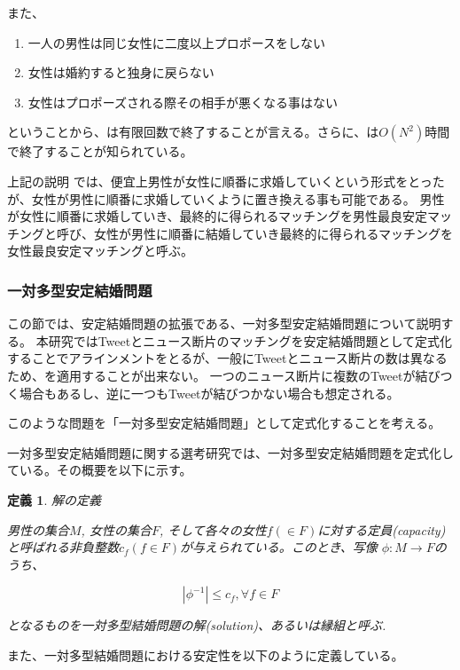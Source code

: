 \documentclass[12pt]{jarticle}
\newtheorem{definittion}{定義}[section]
\begin{document}
また、
\begin{enumerate}
\item 一人の男性は同じ女性に二度以上プロポースをしない
\item 女性は婚約すると独身に戻らない
\item 女性はプロポーズされる際その相手が悪くなる事はない
\end{enumerate}

ということから、\gsa は有限回数で終了することが言える。さらに、\gsa は$O(N^2)$時間で終了することが知られている。

上記の説明 では、便宜上男性が女性に順番に求婚していくという形式をとったが、女性が男性に順番に求婚していくように置き換える事も可能である。
男性が女性に順番に求婚していき、最終的に得られるマッチングを男性最良安定マッチングと呼び、女性が男性に順番に結婚していき最終的に得られるマッチングを女性最良安定マッチングと呼ぶ。

\subsubsection{一対多型安定結婚問題}
この節では、安定結婚問題の拡張である、一対多型安定結婚問題について説明する。
本研究ではTweetとニュース断片のマッチングを安定結婚問題として定式化することでアラインメントをとるが、一般にTweetとニュース断片の数は異なるため、\gsa を適用することが出来ない。
一つのニュース断片に複数のTweetが結びつく場合もあるし、逆に一つもTweetが結びつかない場合も想定される。

このような問題を「一対多型安定結婚問題」として定式化することを考える。

一対多型安定結婚問題に関する選考研究\cite{psmp}では、一対多型安定結婚問題を定式化している。その概要を以下に示す。

\begin{definittion}
\label{psmp_def_1}
解の定義

男性の集合$M$, 女性の集合$F$, そして各々の女性$f(\in F)$に対する定員(capacity)と呼ばれる非負整数$c_f(f \in F)$が与えられている。このとき、写像 $\phi : M \rightarrow F$のうち、

\begin{equation}
| \phi^{-1} | \leq c_f, \forall f \in F
\end{equation}

となるものを一対多型結婚問題の解(solution)、あるいは縁組と呼ぶ.
\end{definittion}

また、一対多型結婚問題における安定性を以下のように定義している。
\end{document}
